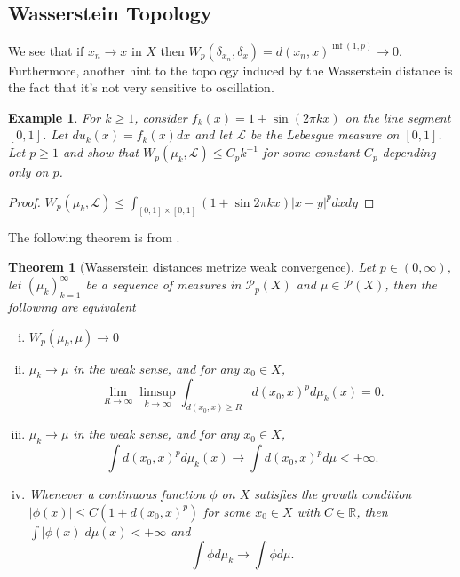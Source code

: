 \documentclass[12pt]{article}
\newcommand{\R}{\mathbb{R}}
\theoremstyle{plain}
\newtheorem{thm}{Theorem}[section]
\newtheorem{exmp}{Example}[section]
\numberwithin{equation}{section}
\begin{document}
\subsection{Wasserstein Topology}
We see that if $x_n\to x$ in $X$ then
\(W_p(\delta_{x_n},\delta_x) = d(x_n,x)^{\inf{(1,p)}} \to 0\). Furthermore, another hint to the topology induced by the Wasserstein distance is the fact that it's not very sensitive to oscillation.
\begin{exmp}
  For $k\ge 1$, consider $f_k(x)=1+\sin(2\pi k x)$ on the line segment $[0,1]$. Let $du_k(x) = f_k(x)dx$ and let $\mathcal{L}$ be the Lebesgue measure on $[0,1]$. Let $p\ge 1$ and show that $W_p(\mu_k,\mathcal{L}) \le C_pk^{-1}$ for some constant $C_p$ depending only on $p$.
\end{exmp}
\begin{proof}
  $W_p(\mu_k,\mathcal{L}) \le \int_{[0,1]\times[0,1]}(1+\sin{2\pi k x})|x-y|^pdxdy$
\end{proof}
The following theorem is from \cite{villani}.
\begin{thm}[Wasserstein distances metrize weak convergence]\label{thm:weak}
	Let $p\in(0,\infty)$, let $(\mu_k)_{k=1}^\infty$ be a sequence of measures in $\mathcal{P}_p(X)$ and $\mu\in \mathcal{P}(X)$, then the following are equivalent
  	\begin{enumerate}[(i)]
		\item $W_p(\mu_k,\mu)\to 0$
		\item $\mu_k\to\mu$ in the weak sense, and for any $x_0\in X$, 
		\[\lim_{R\to\infty}\limsup_{k\to\infty} \int_{d(x_0,x)\ge R} d(x_0,x)^pd\mu_k(x) = 0.\]
    \item $\mu_k\to\mu$ in the weak sense, and for any $x_0\in X$, 
    \[\int d(x_0,x)^pd\mu_k(x) \to \int d(x_0,x)^pd\mu < +\infty.\]
    \item Whenever a continuous function $\phi$ on $X$ satisfies the growth condition $|\phi(x)| \le C(1+d(x_0,x)^p)$ for some $x_0\in X$ with $C\in \R$, then $\int |\phi(x)|d\mu(x) < +\infty$ and 
     \[\int \phi d\mu_k \to \int \phi d\mu.\]
	\end{enumerate} 
\end{thm}
\end{document}
